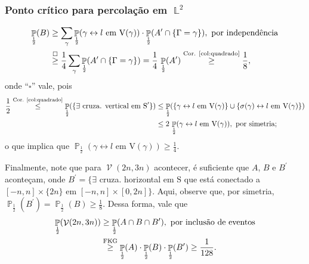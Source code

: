 \documentclass[9pt]{beamer}
\theoremstyle{definition} %
\DeclareMathOperator{\PX}{\mathbb{P}} %
\DeclareMathOperator{\LX}{\mathbb{L}} %
\DeclareMathOperator{\VC}{\mathcal{V}} %
\DeclareMathOperator{\VL}{\mathcal{V}} %
\begin{document}
	\begin{frame}[t]
	\frametitle{Ponto crítico para percolação em $\LX^2$}
	\vspace{-18pt}
	\begin{align*}
	\PX_{\frac{1}{2}}(B) &\geq \sum_{\gamma}\PX_{\frac{1}{2}}(\gamma \leftrightarrow l \text{ em } \text{V}(\gamma)) \cdot \PX_{\frac{1}{2}}(A^{\prime} \cap \{\Gamma = \gamma\}), \text{ por independência} \\
	&\overset{\square}{\geq} \frac{1}{4}\sum_{\gamma}\PX_{\frac{1}{2}}(A^{\prime} \cap \{\Gamma = \gamma\}) = \frac{1}{4}\,\PX_{\frac{1}{2}}(A^{\prime}) \overset{\text{\scriptsize{Cor. \ref{col:quadrado}}}}{\geq} \frac{1}{8},
	\end{align*}  
	onde ``$\square$'' vale, pois
	\begin{align*}
	\frac{1}{2} \overset{\text{\scriptsize{Cor. \ref{col:quadrado}}}}{\leq} \PX_{\frac{1}{2}}(\{\exists \text{ cruza. vertical em } \text{S}^{\prime}\}) &\leq \PX_{\frac{1}{2}}(\{\gamma \leftrightarrow l \text{ em } \text{V}(\gamma)\} \cup \{\sigma(\gamma) \leftrightarrow l \text{ em } \text{V}(\gamma)\}) \\ 
	&\leq 2\,\PX_{\frac{1}{2}}(\gamma \leftrightarrow l \text{ em } \text{V}(\gamma)), \text{ por simetria};
	\end{align*}
	o que implica que $\PX_{\frac{1}{2}}(\gamma \leftrightarrow l \text{ em } \text{V}(\gamma)) \geq \frac{1}{4}$.\pause
	
	Finalmente, note que para $\VC(2n, 3n)$ acontecer, é suficiente que $A$, $B$ e $B^{\prime}$ aconteçam, onde $B^{\prime} = \{\exists$ cruza. horizontal em $\text{S}$ que está conectado a $[-n, n] \times \{2n\}$ em $[-n, n] \times [0, 2n]\}$. Aqui, observe que, por simetria, $\PX_{\frac{1}{2}}(B^{\prime}) = \PX_{\frac{1}{2}}(B) \geq \frac{1}{8}$. Dessa forma, vale que 
	\begin{align*}
	\PX_{\frac{1}{2}}(\VL(2n, 3n)) &\geq \PX_{\frac{1}{2}}(A \cap B \cap B^{\prime}), \text{ por inclusão de eventos} \\
	&\overset{\text{\scriptsize{FKG}}}{\geq} \PX_{\frac{1}{2}}(A) \cdot \PX_{\frac{1}{2}}(B) \cdot \PX_{\frac{1}{2}}(B^{\prime}) \geq \frac{1}{128}.
	\end{align*}
	\end{frame}
\end{document}
